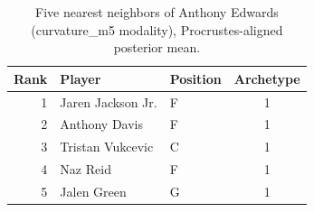 \begin{table}[htbp]
  \centering\small
  \begin{tabular}{rllc}
    \toprule
    Rank & Player & Position & Archetype \\
    \midrule
    1 & Jaren Jackson Jr. & F & 1 \\
    2 & Anthony Davis & F & 1 \\
    3 & Tristan Vukcevic & C & 1 \\
    4 & Naz Reid & F & 1 \\
    5 & Jalen Green & G & 1 \\
    \bottomrule
  \end{tabular}
  \caption{Five nearest neighbors of Anthony Edwards (curvature_m5 modality), Procrustes-aligned posterior mean.}
  \label{tab:Anthony_Edwards_neighbors_curvature_m5}
\end{table}

